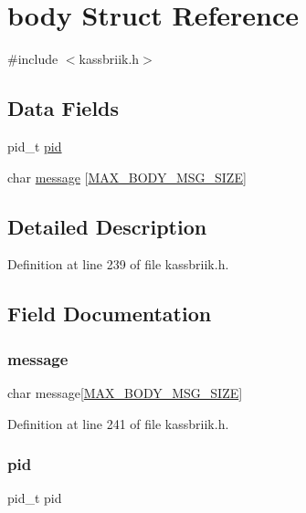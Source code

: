 \hypertarget{structbody}{}\section{body Struct Reference}
\label{structbody}


{\ttfamily \#include $<$kassbriik.\+h$>$}

\subsection*{Data Fields}
\begin{DoxyCompactItemize}
\item 
pid\+\_\+t \hyperlink{structbody_ae0d46a978d5cd6707411f276ad869b9c}{pid}
\item 
char \hyperlink{structbody_ac2ac923fc89ad742c924ee62face9dc4}{message} \mbox{[}\hyperlink{kassbriik_8h_a1a92f29d280d7de1b5bc07f16dc933bf}{M\+A\+X\+\_\+\+B\+O\+D\+Y\+\_\+\+M\+S\+G\+\_\+\+S\+I\+ZE}\mbox{]}
\end{DoxyCompactItemize}


\subsection{Detailed Description}


Definition at line 239 of file kassbriik.\+h.



\subsection{Field Documentation}
\mbox{\label{structbody_ac2ac923fc89ad742c924ee62face9dc4}} 
\subsubsection{\texorpdfstring{message}{message}}
{\footnotesize\ttfamily char message\mbox{[}\hyperlink{kassbriik_8h_a1a92f29d280d7de1b5bc07f16dc933bf}{M\+A\+X\+\_\+\+B\+O\+D\+Y\+\_\+\+M\+S\+G\+\_\+\+S\+I\+ZE}\mbox{]}}



Definition at line 241 of file kassbriik.\+h.

\mbox{\label{structbody_ae0d46a978d5cd6707411f276ad869b9c}} 
\subsubsection{\texorpdfstring{pid}{pid}}
{\footnotesize\ttfamily pid\+\_\+t pid}



